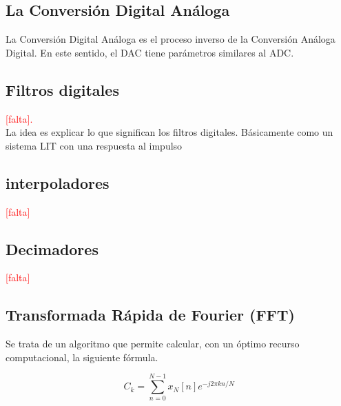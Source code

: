 \subsection{La Conversión Digital Análoga}
La Conversión Digital Análoga es el proceso inverso de la Conversión Análoga Digital. En este sentido, el DAC tiene parámetros similares al ADC.

\subsection{Filtros digitales}
\textcolor{Red}{[falta]. }\\

La idea es explicar lo que significan los filtros digitales. Básicamente como un sistema LIT con una respuesta al impulso

\subsection{interpoladores}
\textcolor{Red}{[falta]}
\subsection{Decimadores}
\textcolor{Red}{[falta]}

\subsection{Transformada Rápida de Fourier (FFT)}
Se trata de un algoritmo que permite calcular, con un óptimo recurso computacional, la siguiente fórmula.

\begin{equation} \label{capdos}
	 C_{k} =  \sum_{n=0}^{N-1}x_{N} [n]e^{-j2 \pi kn/N}
\end{equation}

